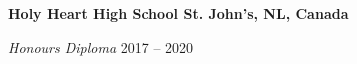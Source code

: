 \begin{itemize}
\textbf{Holy Heart High School \hfill St. John's, NL, Canada} \par
\textit{Honours Diploma} \hfill 2017 -- 2020\par
\end{itemize}\vspace{0.1cm}\par
